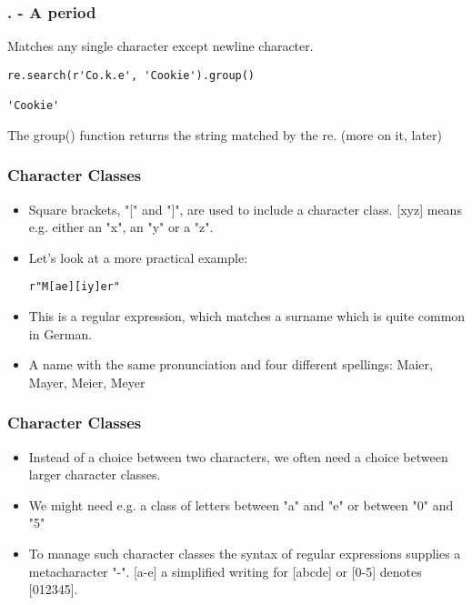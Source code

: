  \begin{frame}[fragile]
\frametitle{. - A period}
Matches any single character except newline character.
\begin{lstlisting}
re.search(r'Co.k.e', 'Cookie').group()

'Cookie'
\end{lstlisting}

The group() function returns the string matched by the re. (more on it, later)
\end{frame}



 \begin{frame}[fragile]
\frametitle{Character Classes}

\begin{itemize}
\item Square brackets, "[" and "]", are used to include a character class. [xyz] means e.g. either an "x", an "y" or a "z". 
\item Let's look at a more practical example:

\begin{lstlisting}
r"M[ae][iy]er"
\end{lstlisting}
\item This is a regular expression, which matches a surname which is quite common in German. 
\item A name with the same pronunciation and four different spellings: Maier, Mayer, Meier, Meyer 
\end{itemize}
\end{frame}

 \begin{frame}[fragile]
\frametitle{Character Classes}

\begin{itemize}
\item Instead of a choice between two characters, we often need a choice between larger character classes. 
\item We might need e.g. a class of letters between "a" and "e" or between "0" and "5"
\item To manage such character classes the syntax of regular expressions supplies a metacharacter "-". [a-e] a simplified writing for [abcde] or [0-5] denotes [012345]. 
\end{itemize}
\end{frame}


